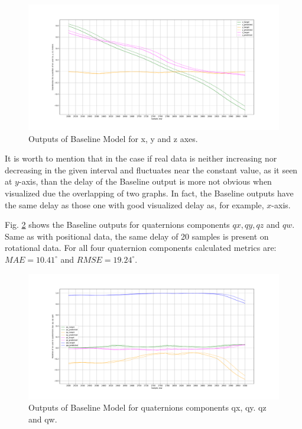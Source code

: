 \begin{figure}[htb]
	\begin{center}
		\includegraphics[width=1\textwidth, keepaspectratio]{gfx/base_zoom-xyz_position.pdf}
		\caption{\label{fig:base_xyz} Outputs of Baseline Model for x, y and z axes.}
	\end{center}
\end{figure}

It is worth to mention that in the case if real data is neither increasing nor decreasing in the given interval and fluctuates near the constant value, as it seen at $y$-axis, than the delay of the Baseline output is more not obvious when visualized due the overlapping of two graphs. In fact, the Baseline outputs have the same delay as those one with good visualized delay as, for example, $x$-axis.

Fig. \ref{fig:base_quat_xyzw} shows the Baseline outputs for quaternions components $qx, qy, qz$ and $qw$. Same as with positional data, the same delay of 20 samples is present on rotational data. For all four quaternion components calculated metrics  are: $MAE = 10.41^{\circ}$ and $RMSE =19.24^{\circ}$.  

\begin{figure}[htb]
	\begin{center}
		\includegraphics[width=1\textwidth, keepaspectratio]{gfx/base_zoom-qx_qy_qz_qw_rotation.pdf}
		\caption{\label{fig:base_quat_xyzw} Outputs of Baseline Model for quaternions components qx, qy. qz and qw.}
	\end{center}
\end{figure}

